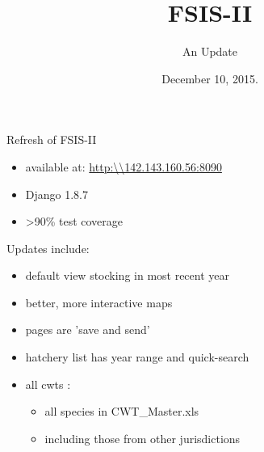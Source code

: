 \documentclass[presentation, smaller]{beamer}
\author{An Update}
\date{December 10, 2015.}
\title{FSIS-II}
\begin{document}
\maketitle


\begin{frame}[label=sec-1]{Refresh of FSIS-II}
\begin{itemize}
\item available at: \url{http:\\142.143.160.56:8090}
\item Django 1.8.7
\item >90\% test coverage
\end{itemize}
\end{frame}

\begin{frame}[label=sec-2]{Updates include:}
\begin{itemize}
\item default view stocking in most recent year
\item better, more interactive maps
\item pages are 'save and send'
\item hatchery list has year range and quick-search
\item all cwts :
\begin{itemize}
\item all species in CWT\_Master.xls
\item including those from other jurisdictions
\end{itemize}
\end{itemize}
\end{frame}
\end{document}
